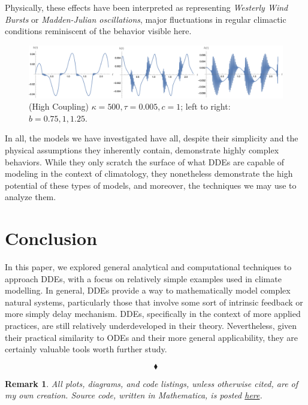 \documentclass[12pt]{article}
\newtheorem{remark}{Remark}
\begin{document}
Physically, these effects have been interpreted as representing \emph{Westerly Wind Bursts} or \emph{Madden-Julian oscillations}\cite{wwb}, major fluctuations in regular climactic conditions reminiscent of the behavior visible here.
\begin{figure}
    \centering
    \includegraphics*[width=1\linewidth]{figures/weird.png}
    \caption{(High Coupling) $\kappa = 500, \tau = 0.005, c = 1$; left to right: $b = 0.75, 1, 1.25$.}
    \label{fig:weird}
\end{figure}

In all, the models we have investigated have all, despite their simplicity and the physical assumptions they inherently contain, demonstrate highly complex behaviors. While they only scratch the surface of what DDEs are capable of modeling in the context of climatology, they nonetheless demonstrate the high potential of these types of models, and moreover, the techniques we may use to analyze them.

\section{Conclusion}

In this paper, we explored general analytical and computational techniques to approach DDEs, with a focus on relatively simple examples used in climate modelling. In general, DDEs provide a way to mathematically model complex natural systems, particularly those that involve some sort of intrinsic feedback or more simply delay mechanism. DDEs, specifically in the context of more applied practices, are still relatively underdeveloped in their theory. Nevertheless, given their practical similarity to ODEs and their more general applicability, they are certainly valuable tools worth further study.


$$\blacklozenge$$


\begin{remark}
    All plots, diagrams, and code listings, unless otherwise cited, are of my own creation. Source code, written in Mathematica, is posted \href{https://github.com/louismeunier/math376-final}{here}.
\end{remark}
\printbibliography
\end{document}
